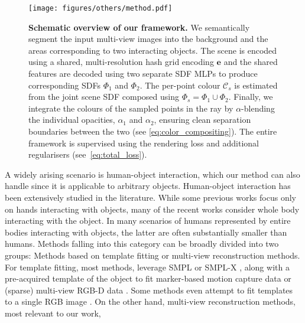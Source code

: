 \begin{figure*}
    \centering
    \hspace*{10pt}\texttt{[image: figures/others/method.pdf]}
    \caption{\textbf{Schematic overview of our framework.} 
    We semantically segment the input multi-view images into the background and the areas corresponding to two interacting objects. 
    The scene is encoded using a shared, multi-resolution hash grid encoding $\mathbf{e}$ and 
    the shared features are decoded using two separate SDF MLPs to produce corresponding SDFs $\Phi_1$ and $\Phi_2$.
    The per-point colour $\mathcal{C}_s$ is estimated from the joint scene SDF  composed using $\Phi_s = \Phi_1 \cup \Phi_2$.
    Finally, we integrate the colours of the sampled points in the ray by $\alpha$-blending  the individual opacities, $\alpha_1$ and $\alpha_2$, ensuring clean separation boundaries between the two (see \cref{eq:color_compositing}). 
    The entire framework is supervised using the rendering loss and additional regularisers (see~\cref{eq:total_loss}).
    }
    \label{fig:joint_sdf}
    \vspace{-1em}
\end{figure*}
A widely arising scenario is human-object interaction, which our method can also handle since it is applicable to arbitrary objects. 
Human-object interaction has been extensively studied in the literature. 
While some previous works \cite{kwon2021h2o,hampali2020honnotate,Brahmbhatt2020contactpose,chao2021dexycb,Freihand2019,FirstPersonAction_CVPR2018,DecafTOG2023} focus only on hands interacting with objects, 
many of the recent works \cite{bhatnagar22behave,GRAB:2020,jiang2022fullbody,xie2022chore,fan2023arctic,huang2022intercap,zhang2020phosa,Li_3DV2022,zhang2023neuraldome,jiang2022neuralhofusion,tretschk2024scenerflow} consider whole body interacting with the object.
In many scenarios of humans represented by entire bodies interacting with objects, the latter are often substantially smaller than humans. 
Methods falling into this category can be broadly divided into two groups: Methods based on template fitting or multi-view reconstruction methods. 
For template fitting, most methods, leverage SMPL or SMPL-X \cite{SMPL:2015,SMPL-X:2019}, 
along with a pre-acquired template of the object to fit marker-based motion capture data \cite{GRAB:2020,fan2023arctic}
or (sparse) multi-view RGB-D data \cite{bhatnagar22behave, huang2022intercap}. 
Some methods even attempt to fit templates to a single RGB image \cite{zhang2020phosa,xie2022chore}.
On the other hand, multi-view reconstruction methods, most relevant to our work, 
